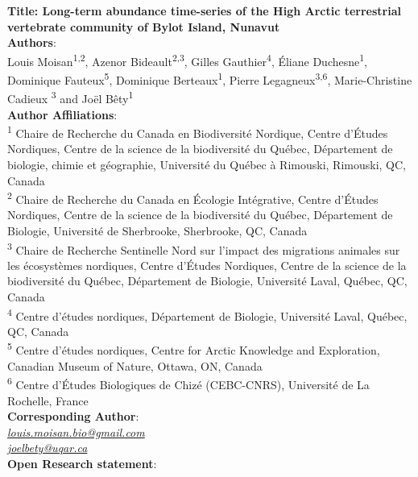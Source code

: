 \documentclass[a4paper,twoside,12pt]{article}
\begin{document}
 
\begingroup  
  \centering
\textbf{Title: Long-term abundance time-series of the High Arctic terrestrial vertebrate community of Bylot Island, Nunavut}\\[1.5em]

\textbf{Authors}:\\
 Louis Moisan\textsuperscript{1,2}, Azenor Bideault\textsuperscript{2,3}, Gilles Gauthier\textsuperscript{4}, Éliane Duchesne\textsuperscript{1}, 
 Dominique Fauteux\textsuperscript{5}, Dominique Berteaux\textsuperscript{1}, Pierre Legagneux\textsuperscript{3,6}, Marie-Christine Cadieux \textsuperscript{3} and Joël Bêty\textsuperscript{1}\\[1.5em]

\textbf{Author Affiliations}:\\
\textsuperscript{1} Chaire de Recherche du Canada en Biodiversité Nordique, Centre d’Études Nordiques, Centre de la science de la biodiversité du Québec, Département de biologie, chimie et géographie, Université du Québec à Rimouski, Rimouski, QC, Canada\\
\textsuperscript{2} Chaire de Recherche du Canada en Écologie Intégrative, Centre d’Études Nordiques, Centre de la science de la biodiversité du Québec, Département de Biologie, Université de Sherbrooke, Sherbrooke, QC, Canada\\
\textsuperscript{3} Chaire de Recherche Sentinelle Nord sur l’impact des migrations animales sur les écosystèmes nordiques, Centre d’Études Nordiques, Centre de la science de la biodiversité du Québec, Département de Biologie, Université Laval, Québec, QC, Canada\\
\textsuperscript{4} Centre d’études nordiques, Département de Biologie, Université Laval, Québec, QC, Canada\\
\textsuperscript{5} Centre d’études nordiques, Centre for Arctic Knowledge and Exploration, Canadian Museum of Nature, Ottawa, ON, Canada\\
\textsuperscript{6} Centre d’Études Biologiques de Chizé (CEBC-CNRS), Université de La Rochelle, France 
\\[1.5em]

\textbf{Corresponding Author}:\\
\textit{\href{mailto:louis.moisan.bio@gmail.com}{louis.moisan.bio@gmail.com}}\\
\textit{\href{mailto:joel_bety@uqar.ca}{joel{\textunderscore}bety@uqar.ca}}
\\[1.5em]

\textbf{Open Research statement}:
\end{document}
